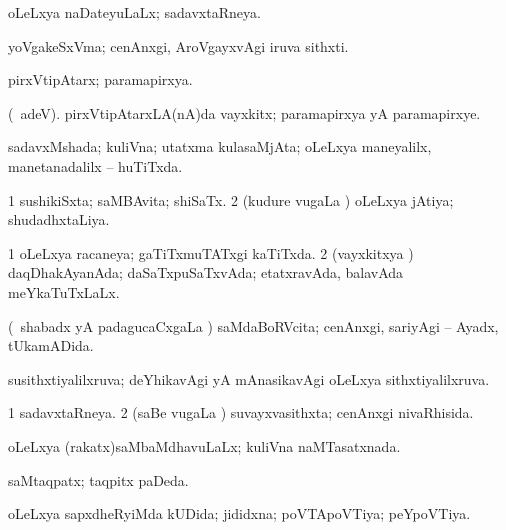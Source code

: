 \bentry
{} 
\gl{\gu}
\expl{}
\bmng
oLeLxya naDateyuLaLx; sadavxtaRneya. 
\emng
\eentry

\bentry
{} 
\gl{\nA}
\expl{}
\bmng
yoVgakeSxVma; cenAnxgi, AroVgayxvAgi iruva sithxti. 
\emng
\eentry

\bentry
{} 
\gl{\gu}
\expl{}
\bmng
pirxVtipAtarx; paramapirxya. 
\emng
\eentry

\bentry
{} 
\gl{\nA}
\expl{}
\bmng
(\bava\ adeV). pirxVtipAtarxLA(nA)da vayxkitx; paramapirxya yA paramapirxye. 
\emng
\eentry

\bentry
{} 
\gl{\gu}
\expl{}
\bmng
sadavxMshada; kuliVna; utatxma kulasaMjAta; oLeLxya maneyalilx, manetanadalilx -- huTiTxda. 
\emng
\eentry

\bentry
{} 
\gl{\gu}
\expl{}
\bmng
\bnum
\num{1} sushikiSxta; saMBAvita; shiSaTx. 
\num{2} (kudure \mo vugaLa \vi) oLeLxya jAtiya; shudadhxtaLiya. 
\enum
\emng
\eentry

\bentry
{} 
\gl{\gu}
\expl{}
\bmng
\bnum
\num{1} oLeLxya racaneya; gaTiTxmuTATxgi kaTiTxda. 
\num{2} (vayxkitxya \vi) daqDhakAyanAda; daSaTxpuSaTxvAda; etatxravAda, balavAda meYkaTuTxLaLx. 
\enum
\emng
\eentry

\bentry
{} 
\gl{\gu}
\expl{}
\bmng
(\kanmu\ shabadx yA padagucaCxgaLa \vi) saMdaBoRVcita; cenAnxgi, sariyAgi -- Ayadx, tUkamADida. 
\emng
\eentry

\bentry
{} 
\gl{\gu}
\expl{}
\bmng
susithxtiyalilxruva; deYhikavAgi yA mAnasikavAgi oLeLxya sithxtiyalilxruva. 
\emng
\eentry

\bentry
{} 
\gl{\gu}
\expl{}
\bmng
\bnum
\num{1} sadavxtaRneya. 
\num{2} (saBe \mo vugaLa \vi) suvayxvasithxta; cenAnxgi nivaRhisida. 
\enum
\emng
\eentry

\bentry
{} 
\gl{\gu}
\expl{}
\bmng
oLeLxya (rakatx)saMbaMdhavuLaLx; kuliVna naMTasatxnada. 
\emng
\eentry

\bentry
{} 
\gl{\gu}
\expl{}
\bmng
saMtaqpatx; taqpitx paDeda. 
\emng
\eentry

\bentry
{} 
\gl{\gu}
\expl{}
\bmng
oLeLxya sapxdheRyiMda kUDida; jididxna; poVTApoVTiya; peYpoVTiya. 
\emng
\eentry

